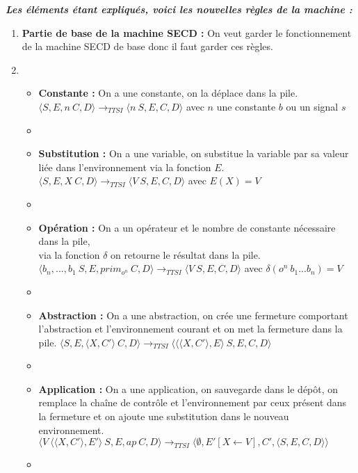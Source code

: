 \documentclass[10pt,a4paper]{article}
\begin{document}
				\textbf{\textit{Les éléments étant expliqués, voici les nouvelles règles de la machine :}}
				\smallbreak
				\begin{enumerate}
					\item[] \textbf{Partie de base de la machine SECD :} On veut garder le fonctionnement de la machine SECD de base donc il faut garder ces règles.	
					\item[]
					\begin{itemize}
						\item[] \textbf{Constante :} On a une constante, on la déplace dans la pile.
						\smallbreak
						$\langle S,E,n~C,D\rangle 
						\longrightarrow_{TTSI} 
						\langle n~S,E,C,D\rangle$ avec $n$ une constante $b$ ou un signal $s$
						\item[]
						
						\item[] \textbf{Substitution :} On a une variable, on substitue la variable par sa valeur liée dans l'environnement via la fonction $E$.
						\smallbreak
						$\langle S,E,X~C,D\rangle
						\longrightarrow_{TTSI} 
						\langle V~S,E,C,D\rangle$ avec $E(X) = V$
						\item[]
						
						\item[] \textbf{Opération :} On a un opérateur et le nombre de constante nécessaire dans la pile, \\via la fonction $\delta$ on retourne le résultat dans la pile.
						\smallbreak
						$\langle b_{n},...,b_{1}~S,E,prim_{o^{n}}~C,D\rangle
						\longrightarrow_{TTSI} 
						\langle V~S,E,C,D\rangle$ avec $\delta(o^{n}~b_{1}...b_{n}) = V$
						\item[]
						
						\item[]  \textbf{Abstraction :} On a une abstraction, on crée une fermeture comportant l'abstraction et l'environnement courant et on met la fermeture dans la pile.
						\smallbreak
						$\langle S,E,\langle X,C'\rangle~C,D\rangle
						\longrightarrow_{TTSI} 
						\langle \langle\langle X,C'\rangle,E\rangle~S,E,C,D\rangle$
						\item[]
						
						\item[]  \textbf{Application :} On a une application, on sauvegarde dans le dépôt, on remplace la chaîne de contrôle et l'environnement par ceux présent dans la fermeture et on ajoute une substitution  dans le nouveau environnement.
						\smallbreak
						$\langle V~\langle\langle X,C'\rangle,E'\rangle~S,E,ap~C,D\rangle
						\longrightarrow_{TTSI} 
						\langle \emptyset,E'[X \leftarrow V],C',\langle S,E,C,D\rangle\rangle$
						\item[] 
						

\end{itemize}
\end{enumerate}
\end{document}
